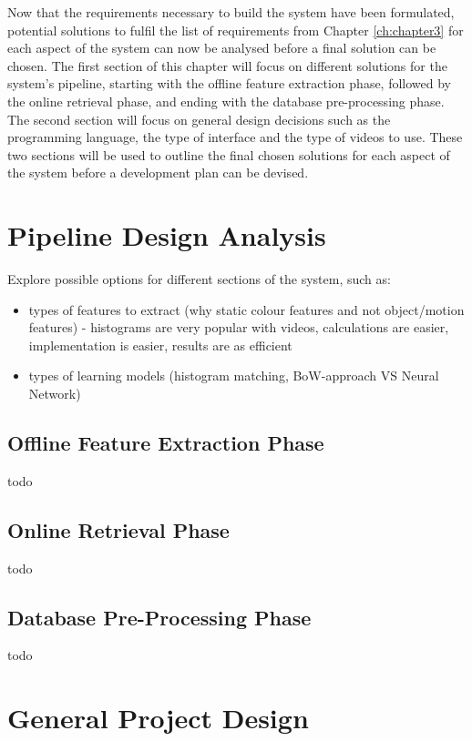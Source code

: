 Now that the requirements necessary to build the system have been formulated, potential solutions to fulfil the list of requirements from Chapter \ref{ch:chapter3} for each aspect of the system can now be analysed before a final solution can be chosen. The first section of this chapter will focus on different solutions for the system's pipeline, starting with the offline feature extraction phase, followed by the online retrieval phase, and ending with the database pre-processing phase. The second section will focus on general design decisions such as the programming language, the type of interface and the type of videos to use. These two sections will be used to outline the final chosen solutions for each aspect of the system before a development plan can be devised.

\section{Pipeline Design Analysis}

Explore possible options for different sections of the system, such as:
    \begin{itemize}
        \item types of features to extract (why static colour features and not object/motion features) - histograms are very popular with videos, calculations are easier, implementation is easier, results are as efficient
        \item types of learning models (histogram matching, BoW-approach VS Neural Network)
    \end{itemize}

\subsection{Offline Feature Extraction Phase}

todo

\subsection{Online Retrieval Phase}

todo

\subsection{Database Pre-Processing Phase}

todo

\section{General Project Design}

